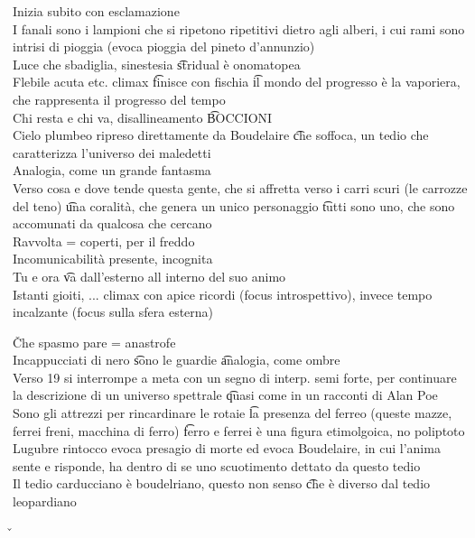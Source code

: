 \documentclass[12pt]{article}
\begin{document}
Inizia subito con esclamazione \\
I fanali sono i lampioni che si ripetono ripetitivi dietro agli alberi, i cui rami sono intrisi di pioggia (evoca pioggia del pineto d'annunzio) \\
Luce che sbadiglia, sinestesia \t stridual è onomatopea \\
Flebile acuta etc. climax \t finisce con fischia \t il mondo del progresso è la vaporiera, che rappresenta il progresso del tempo \\
Chi resta e chi va, disallineamento \t BOCCIONI \\
Cielo plumbeo ripreso direttamente da Boudelaire \t che soffoca, un tedio che caratterizza l'universo dei maledetti \\
Analogia, come un grande fantasma \\
Verso cosa e dove tende questa gente, che si affretta verso i carri scuri (le carrozze del teno) \t una coralità, che genera un unico personaggio \t tutti sono uno, che sono accomunati da qualcosa che cercano \\
Ravvolta = coperti, per il freddo \\
Incomunicabilità presente, incognita \\
Tu e ora \t va dall'esterno all interno del suo animo \\
Istanti gioiti, ... climax con apice ricordi (focus introspettivo), invece tempo incalzante (focus sulla sfera esterna)

\v

Che spasmo pare = anastrofe \\
Incappucciati di nero \t sono le guardie \t analogia, come ombre \\
Verso 19 si interrompe a meta con un segno di interp. semi forte, per continuare la descrizione di un universo spettrale \t quasi come in un racconti di Alan Poe \\
Sono gli attrezzi per rincardinare le rotaie \t la presenza del ferreo (queste mazze, ferrei freni, macchina di ferro) \t ferro e ferrei è una figura etimolgoica, no poliptoto \\
Lugubre rintocco evoca presagio di morte ed evoca Boudelaire, in cui l'anima sente e risponde, ha dentro di se uno scuotimento dettato da questo tedio \\
Il tedio carducciano è boudelriano, questo non senso \t che è diverso dal tedio leopardiano

\v
\end{document}
